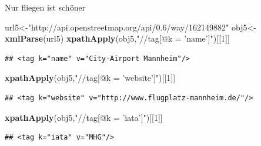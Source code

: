 \documentclass[ignorenonframetext,]{beamer}
\newenvironment{Shaded}{\begin{snugshade}}{\end{snugshade}}
\newcommand{\DecValTok}[1]{\textcolor[rgb]{0.27,0.67,0.26}{#1}}
\newcommand{\KeywordTok}[1]{\textcolor[rgb]{0.26,0.66,0.93}{\textbf{#1}}}
\newcommand{\NormalTok}[1]{\textcolor[rgb]{0.74,0.68,0.62}{#1}}
\newcommand{\StringTok}[1]{\textcolor[rgb]{0.02,0.61,0.04}{#1}}
\begin{document}
\begin{frame}[fragile]{Nur fliegen ist schöner}
\protect\hypertarget{nur-fliegen-ist-schoner}{}

\begin{Shaded}
\begin{Highlighting}[]
\NormalTok{url5<-}\StringTok{"http://api.openstreetmap.org/api/0.6/way/162149882"}
\NormalTok{obj5<-}\KeywordTok{xmlParse}\NormalTok{(url5)}
\KeywordTok{xpathApply}\NormalTok{(obj5,}\StringTok{"//tag[@k = 'name']"}\NormalTok{)[[}\DecValTok{1}\NormalTok{]]}
\end{Highlighting}
\end{Shaded}

\begin{verbatim}
## <tag k="name" v="City-Airport Mannheim"/>
\end{verbatim}

\begin{Shaded}
\begin{Highlighting}[]
\KeywordTok{xpathApply}\NormalTok{(obj5,}\StringTok{"//tag[@k = 'website']"}\NormalTok{)[[}\DecValTok{1}\NormalTok{]]}
\end{Highlighting}
\end{Shaded}

\begin{verbatim}
## <tag k="website" v="http://www.flugplatz-mannheim.de/"/>
\end{verbatim}

\begin{Shaded}
\begin{Highlighting}[]
\KeywordTok{xpathApply}\NormalTok{(obj5,}\StringTok{"//tag[@k = 'iata']"}\NormalTok{)[[}\DecValTok{1}\NormalTok{]]}
\end{Highlighting}
\end{Shaded}

\begin{verbatim}
## <tag k="iata" v="MHG"/>
\end{verbatim}

\end{frame}
\end{document}
